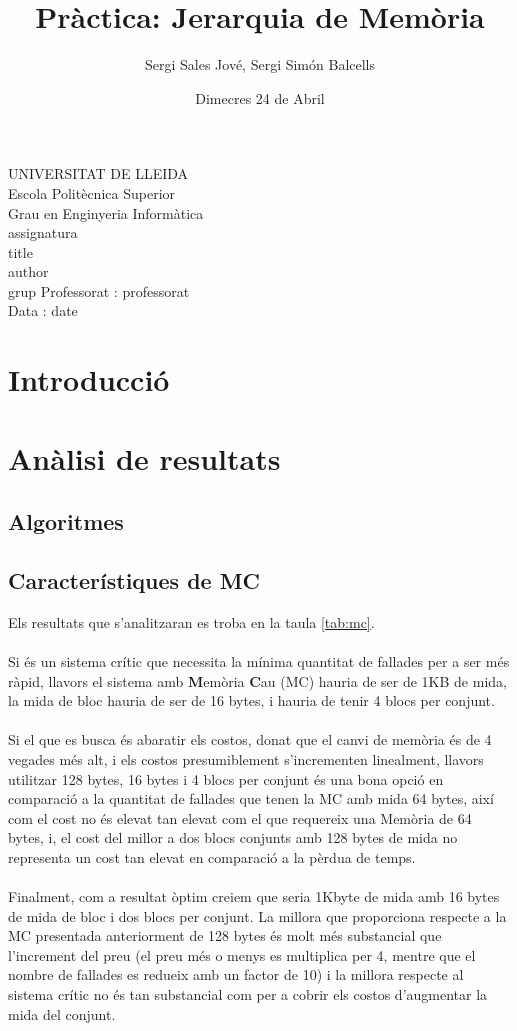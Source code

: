 \documentclass{article}
\title{Pràctica: Jerarquia de Memòria}
\author{Sergi Sales Jové, Sergi Simón Balcells}
\date{Dimecres 24 de Abril}
\renewcommand{\maketitle}{ %
    \begin{titlepage}
        \raggedright{UNIVERSITAT DE LLEIDA \\
            Escola Politècnica Superior \\
            Grau en Enginyeria Informàtica\\
            \1assignatura\\}
            \vspace{5cm}
            \centering\huge{\5title \\}
            \vspace{3cm}
            \large{\6author} \\
            \normalsize{\3grup}
            \vfill
            Professorat : \4professorat \\
            Data : \7date
\end{titlepage}}
\begin{document}
\maketitle
\thispagestyle{empty}

\newpage
{}
\tableofcontents
\newpage
{}
\section{Introducció}
\section{Anàlisi de resultats}
\subsection{Algoritmes}

\subsection{Característiques de MC}
Els resultats que s'analitzaran es troba en la taula \ref{tab:mc}.\\
\\
Si és un sistema crític que necessita la mínima quantitat de fallades per a ser més
ràpid, llavors el sistema amb \textbf{M}emòria \textbf{C}au (MC) hauria de ser de 1KB
de mida, la mida de bloc hauria de ser de 16 bytes, i hauria de tenir 4 blocs per conjunt.\\
\\
Si el que es busca és abaratir els costos, donat que el canvi de memòria és de 4 vegades més
alt, i els costos presumiblement s'incrementen linealment, llavors utilitzar 128 bytes, 16 bytes i
4 blocs per conjunt és una bona opció en comparació a la quantitat de fallades que tenen la MC amb
mida 64 bytes, així com el cost no és elevat tan elevat com el que requereix una Memòria de 64 bytes,
i, el cost del millor a dos blocs conjunts amb 128 bytes de mida no representa un cost tan elevat
en comparació a la pèrdua de temps.\\
\\
Finalment, com a resultat òptim creiem que seria 1Kbyte de mida amb 16 bytes de mida de bloc i
dos blocs per conjunt. La millora que proporciona respecte a la MC presentada anteriorment de 128 bytes
és molt més substancial que l'increment del preu (el preu més o menys es multiplica per 4, mentre que
el nombre de fallades es redueix amb un factor de 10) i la millora respecte al sistema crític no
és tan substancial com per a cobrir els costos d'augmentar la mida del conjunt.
\end{document}
